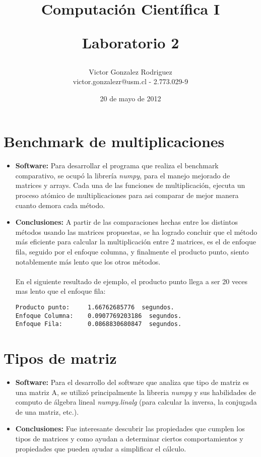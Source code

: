 \documentclass[12pt,letterpaper]{article}
\begin{document}
\title{Computaci\'on Científica I \\ \begin{Large}Laboratorio 2\end{Large}} 
\author{Victor Gonzalez Rodriguez\\victor.gonzalezr@usm.cl - 2.773.029-9}
\date{20 de mayo de 2012}
\maketitle


\section{Benchmark de multiplicaciones}
\begin{itemize}
\item \textbf{Software:} Para desarrollar el programa que realiza el benchmark comparativo, se ocupó la librería \textit{numpy}, para el manejo mejorado de matrices y arrays. Cada una de las funciones de multiplicación, ejecuta un proceso atómico de multiplicaciones para asi comparar de mejor manera cuanto demora cada método.
\item \textbf{Conclusiones:} A partir de las comparaciones hechas entre los distintos métodos usando las matrices propuestas, se ha logrado concluir que el método más eficiente para calcular la multiplicación entre 2 matrices, es el de enfoque fila, seguido por el enfoque columna, y finalmente el producto punto, siento notablemente más lento que los otros métodos.\\\\
En el siguiente resultado de ejemplo, el producto punto llega a ser 20 veces mas lento que el enfoque fila:
\begin{verbatim}
Producto punto:		1.66762685776  segundos.
Enfoque Columna:	0.0907769203186  segundos.
Enfoque Fila:		0.0868830680847  segundos.
\end{verbatim}
\end{itemize}

\section{Tipos de matriz}
\begin{itemize}
\item \textbf{Software:} Para el desarrollo del software que analiza que tipo de matriz es una matriz A, se utilizó principalmente la libreria \textit{numpy} y sus habilidades de computo de álgebra lineal \textit{numpy.linalg} (para calcular la inversa, la conjugada de una matriz, etc.).
\item \textbf{Conclusiones:} Fue interesante descubrir las propiedades que cumplen los tipos de matrices y como ayudan a determinar ciertos comportamientos y propiedades que pueden ayudar a simplificar el cálculo.
\end{itemize}
\end{document}
